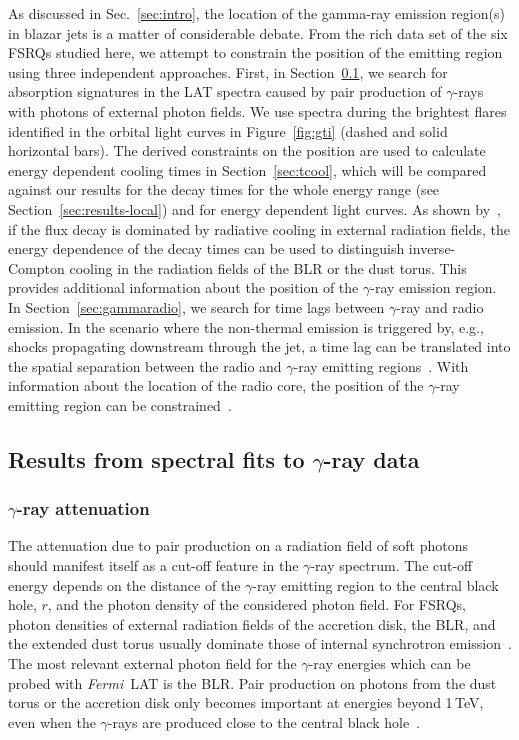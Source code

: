 \documentclass[twocolumn]{aastex62}
\newcommand{\Grays}{$\gamma$-rays\xspace}
\newcommand{\gray}{$\gamma$-ray\xspace}
\newcommand{\FermiLAT}{\emph{Fermi}~LAT\xspace}
\begin{document}
As discussed in Sec.~\ref{sec:intro}, the location of the gamma-ray emission region(s) in blazar jets is a matter of considerable debate.
From the rich data set of the six FSRQs studied here, we attempt to constrain the position of the emitting region using three independent approaches. 
First, in Section~\ref{sec:blrabs}, we search for absorption signatures in the LAT spectra caused by pair production of \Grays with photons of external photon fields. We use spectra during the brightest flares identified in the orbital light curves in Figure~\ref{fig:gti} (dashed and solid horizontal bars).
The derived constraints on the position are used to calculate energy dependent cooling times in Section~\ref{sec:tcool}, which will be compared against our results for the decay times for the whole energy range (see Section~\ref{sec:results-local}) and for energy dependent light curves.
As shown by~\citet{2012ApJ...758L..15D}, if the flux decay is dominated by radiative cooling in external radiation fields, the energy dependence of the decay times can be used to distinguish inverse-Compton cooling in the radiation fields of the BLR or the dust torus.
This provides additional information about the position of the \gray emission region.
In Section~\ref{sec:gammaradio}, we search for time lags between \gray and radio emission. 
In the scenario where the non-thermal emission is triggered by, e.g., shocks propagating downstream through the jet, a time lag can be translated into the spatial separation between the radio and \gray emitting regions~\citep{2014MNRAS.445..428M}. 
With information about the location of the radio core, the position of the \gray emitting region can be constrained~\citep[e.g.,][]{2014MNRAS.441.1899F}. 

\subsection{Results from spectral fits to \gray data}
\label{sec:blrabs}
\subsubsection{\gray attenuation}
The attenuation due to pair production on a radiation field of soft photons should manifest itself as a cut-off feature in the \gray spectrum. 
The cut-off energy depends on the distance of the \gray emitting region to the central black hole, $r$, and the photon density of the considered photon field.
For FSRQs, photon densities of external radiation fields of the accretion disk, the BLR, and the extended dust torus usually dominate those of internal synchrotron emission~\citep[see,e.g.,][]{2012ApJ...758L..15D}.
The most relevant external photon field for the \gray energies which can be probed with \FermiLAT is the BLR. 
Pair production on photons from the dust torus or the accretion disk only becomes important at energies beyond 1\,TeV, even when the \Grays are produced close to the central black hole~\citep{finke2016}.
\end{document}
